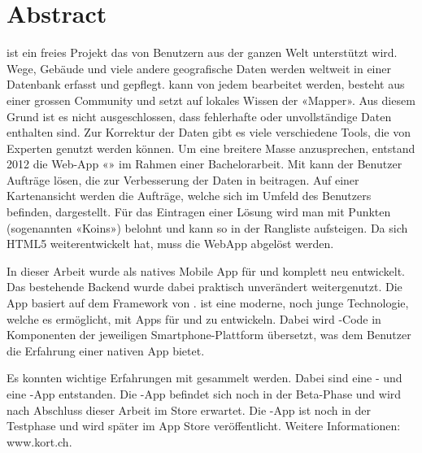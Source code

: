 \chapter*{Abstract}
\thispagestyle{scrheadings}

 ist ein freies Projekt das von Benutzern aus der ganzen Welt unterstützt wird. 
Wege, Gebäude und viele andere geografische Daten werden weltweit in einer Datenbank erfasst und gepflegt. 
 kann von jedem bearbeitet werden, besteht aus einer grossen Community und setzt auf lokales Wissen der «Mapper». 
Aus diesem Grund ist es nicht ausgeschlossen, dass fehlerhafte oder unvollständige Daten enthalten
sind. 
Zur Korrektur der Daten gibt es viele verschiedene Tools, die von Experten genutzt werden können. 
Um eine breitere Masse anzusprechen, entstand 2012 die Web-App «\kort{}» im Rahmen einer Bachelorarbeit. 
Mit \kort{} kann der Benutzer Aufträge lösen, die zur Verbesserung der Daten in  beitragen. 
Auf einer Kartenansicht werden die Aufträge, welche sich im Umfeld des Benutzers befinden, dargestellt. 
Für das Eintragen einer Lösung wird man mit Punkten (sogenannten «Koins») belohnt und kann
so in der Rangliste aufsteigen. 
Da sich HTML5 weiterentwickelt hat, muss die \gls{WebApp} abgelöst werden.

In dieser Arbeit wurde \kort{} als natives Mobile App für  und  komplett neu entwickelt. 
Das bestehende \gls{Backend} wurde dabei praktisch unverändert weitergenutzt. 
Die App basiert auf dem  Framework von . 
 ist eine moderne, noch junge Technologie, welche es ermöglicht, mit  Apps für  und  zu entwickeln. 
Dabei wird -Code in Komponenten der jeweiligen Smartphone-Plattform übersetzt, was dem Benutzer die Erfahrung einer nativen App bietet.

Es konnten wichtige Erfahrungen mit  gesammelt werden. 
Dabei sind eine - und eine -App entstanden. 
Die -App befindet sich noch in der Beta-Phase und wird nach Abschluss dieser Arbeit im  Store erwartet. 
Die -App ist noch in der Testphase und wird später im  App Store veröffentlicht. 
Weitere Informationen: www.kort.ch. 
